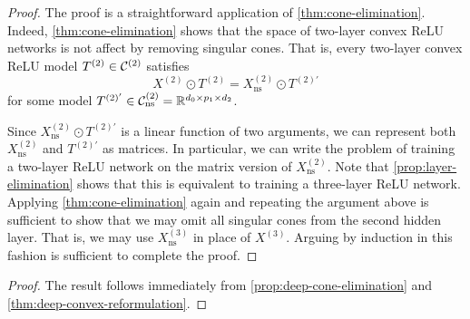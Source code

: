 \deepConeElimination*
\begin{proof}
    The proof is a straightforward application of \cref{thm:cone-elimination}.
    Indeed, \cref{thm:cone-elimination} shows that the space of two-layer
    convex ReLU networks is not affect by removing singular
    cones.
    That is, every two-layer convex ReLU model \( T^{(2)} \in \mathcal{C}^{(2)} \)
    satisfies
    \[
        X^{(2)} \odot T^{(2)} = X_{\text{ns}}^{(2)} \odot T^{(2)'}
    \]
    for some model \( T^{(2)'} \in \mathcal{C}^{(2)}_{\text{ns}} = \mathbb{R}^{d_0 \times p_1 \times d_2} \).

    Since \( X_{\text{ns}}^{(2)} \odot T^{(2)'} \) is a linear function of two arguments,
    we can represent both \( X^{(2)}_{\text{ns}} \) and \( T^{(2)'} \)
    as matrices.
    In particular, we can write the problem of training a two-layer
    ReLU network on the matrix version of \( X^{(2)}_{\text{ns}} \).
    Note that \cref{prop:layer-elimination} shows that this is equivalent
    to training a three-layer ReLU network.
    Applying \cref{thm:cone-elimination} again and repeating the argument
    above is sufficient to show that we may omit all singular cones from
    the second hidden layer.
    That is, we may use \( X^{(3)}_{\text{ns}} \) in place of \( X^{(3)} \).
    Arguing by induction in this fashion is sufficient to complete the proof.
\end{proof}

\coneDecompFormulation*
\begin{proof}
    The result follows immediately from \cref{prop:deep-cone-elimination}
    and \cref{thm:deep-convex-reformulation}.
\end{proof}

